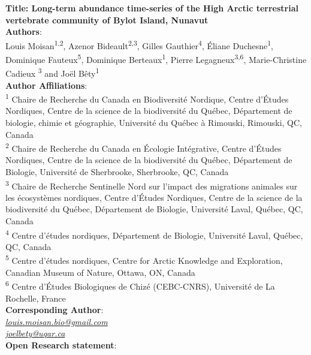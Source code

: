 \documentclass[a4paper,twoside,10pt]{article}
\begin{document}
 
\begingroup  
  \centering
\textbf{Title: Long-term abundance time-series of the High Arctic terrestrial vertebrate community of Bylot Island, Nunavut}\\[1.5em]

\textbf{Authors}:\\
 Louis Moisan\textsuperscript{1,2}, Azenor Bideault\textsuperscript{2,3}, Gilles Gauthier\textsuperscript{4}, Éliane Duchesne\textsuperscript{1}, 
 Dominique Fauteux\textsuperscript{5}, Dominique Berteaux\textsuperscript{1}, Pierre Legagneux\textsuperscript{3,6}, Marie-Christine Cadieux \textsuperscript{3} and Joël Bêty\textsuperscript{1}\\[1.5em]

\textbf{Author Affiliations}:\\
\textsuperscript{1} Chaire de Recherche du Canada en Biodiversité Nordique, Centre d’Études Nordiques, Centre de la science de la biodiversité du Québec, Département de biologie, chimie et géographie, Université du Québec à Rimouski, Rimouski, QC, Canada\\
\textsuperscript{2} Chaire de Recherche du Canada en Écologie Intégrative, Centre d’Études Nordiques, Centre de la science de la biodiversité du Québec, Département de Biologie, Université de Sherbrooke, Sherbrooke, QC, Canada\\
\textsuperscript{3} Chaire de Recherche Sentinelle Nord sur l’impact des migrations animales sur les écosystèmes nordiques, Centre d’Études Nordiques, Centre de la science de la biodiversité du Québec, Département de Biologie, Université Laval, Québec, QC, Canada\\
\textsuperscript{4} Centre d’études nordiques, Département de Biologie, Université Laval, Québec, QC, Canada\\
\textsuperscript{5} Centre d’études nordiques, Centre for Arctic Knowledge and Exploration, Canadian Museum of Nature, Ottawa, ON, Canada\\
\textsuperscript{6} Centre d’Études Biologiques de Chizé (CEBC-CNRS), Université de La Rochelle, France 
\\[1.5em]

\textbf{Corresponding Author}:\\
\textit{\href{mailto:louis.moisan.bio@gmail.com}{louis.moisan.bio@gmail.com}}\\
\textit{\href{mailto:joel_bety@uqar.ca}{joel{\textunderscore}bety@uqar.ca}}
\\[1.5em]

\textbf{Open Research statement}:
\end{document}

